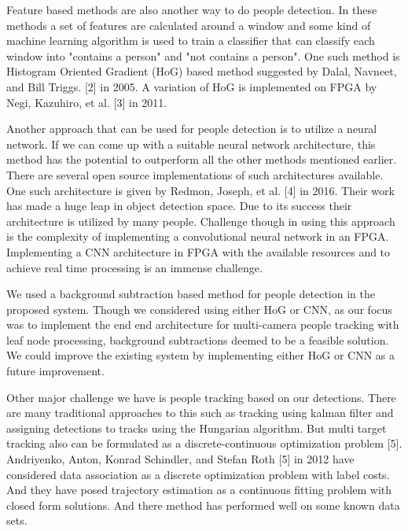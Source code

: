 \documentclass[12pt,a4paper]{report}
\begin{document}
Feature based methods are also another way to do people detection. In these methods a set of features are calculated around a window and some kind of machine learning algorithm is used to train a classifier that can classify each window into "contains a person" and "not contains a person". One such method is Histogram Oriented Gradient (HoG) based method suggested by Dalal, Navneet, and Bill Triggs. [2] in 2005. A variation of HoG is implemented on FPGA by Negi, Kazuhiro, et al. [3] in 2011.\vspace{0.3cm}

Another approach that can be used for people detection is to utilize a neural network. If we can come up with a suitable neural network architecture, this method has the potential to outperform all the other methods mentioned earlier. There are several open source implementations of such architectures available. One such architecture is given by Redmon, Joseph, et al. [4] in 2016. Their work has made a huge leap in object detection space. Due to its success their architecture is utilized by many people. Challenge though in using this approach is the complexity of implementing a convolutional neural network in an FPGA.  Implementing a CNN architecture in FPGA with the available resources and to achieve real time processing is an immense challenge. \vspace{0.3cm}

We used a background subtraction based method for people detection in the proposed system. Though we considered using either HoG or CNN, as our focus was to implement the end end architecture for multi-camera people tracking with leaf node processing, background subtractions deemed to be a feasible solution. We could improve the existing system by implementing either HoG or CNN as a future improvement.\vspace{0.3cm}

Other major challenge we have is people tracking based on our detections. There are many traditional approaches to this such as tracking using kalman filter and assigning detections to tracks using the Hungarian algorithm. But multi target tracking also can be formulated as a discrete-continuous optimization problem [5]. Andriyenko, Anton, Konrad Schindler, and Stefan Roth [5] in 2012 have considered data association as a discrete optimization problem with label costs. And they have posed trajectory estimation as a continuous fitting problem with closed form solutions. And there method has performed well on some known data sets.\vspace{0.3cm}
\end{document}
